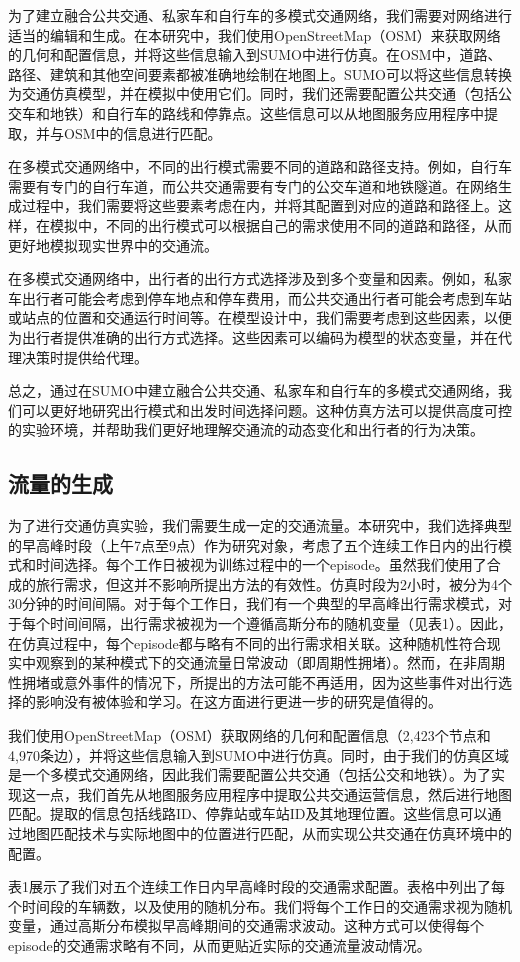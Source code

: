 为了建立融合公共交通、私家车和自行车的多模式交通网络，我们需要对网络进行适当的编辑和生成。在本研究中，我们使用OpenStreetMap（OSM）来获取网络的几何和配置信息，并将这些信息输入到SUMO中进行仿真。在OSM中，道路、路径、建筑和其他空间要素都被准确地绘制在地图上。SUMO可以将这些信息转换为交通仿真模型，并在模拟中使用它们。同时，我们还需要配置公共交通（包括公交车和地铁）和自行车的路线和停靠点。这些信息可以从地图服务应用程序中提取，并与OSM中的信息进行匹配。

在多模式交通网络中，不同的出行模式需要不同的道路和路径支持。例如，自行车需要有专门的自行车道，而公共交通需要有专门的公交车道和地铁隧道。在网络生成过程中，我们需要将这些要素考虑在内，并将其配置到对应的道路和路径上。这样，在模拟中，不同的出行模式可以根据自己的需求使用不同的道路和路径，从而更好地模拟现实世界中的交通流。

在多模式交通网络中，出行者的出行方式选择涉及到多个变量和因素。例如，私家车出行者可能会考虑到停车地点和停车费用，而公共交通出行者可能会考虑到车站或站点的位置和交通运行时间等。在模型设计中，我们需要考虑到这些因素，以便为出行者提供准确的出行方式选择。这些因素可以编码为模型的状态变量，并在代理决策时提供给代理。

总之，通过在SUMO中建立融合公共交通、私家车和自行车的多模式交通网络，我们可以更好地研究出行模式和出发时间选择问题。这种仿真方法可以提供高度可控的实验环境，并帮助我们更好地理解交通流的动态变化和出行者的行为决策。

\subsection{流量的生成}
为了进行交通仿真实验，我们需要生成一定的交通流量。本研究中，我们选择典型的早高峰时段（上午7点至9点）作为研究对象，考虑了五个连续工作日内的出行模式和时间选择。每个工作日被视为训练过程中的一个episode。虽然我们使用了合成的旅行需求，但这并不影响所提出方法的有效性。仿真时段为2小时，被分为4个30分钟的时间间隔。对于每个工作日，我们有一个典型的早高峰出行需求模式，对于每个时间间隔，出行需求被视为一个遵循高斯分布的随机变量（见表1）。因此，在仿真过程中，每个episode都与略有不同的出行需求相关联。这种随机性符合现实中观察到的某种模式下的交通流量日常波动（即周期性拥堵）。然而，在非周期性拥堵或意外事件的情况下，所提出的方法可能不再适用，因为这些事件对出行选择的影响没有被体验和学习。在这方面进行更进一步的研究是值得的。

我们使用OpenStreetMap（OSM）获取网络的几何和配置信息（2,423个节点和4,970条边），并将这些信息输入到SUMO中进行仿真。同时，由于我们的仿真区域是一个多模式交通网络，因此我们需要配置公共交通（包括公交和地铁）。为了实现这一点，我们首先从地图服务应用程序中提取公共交通运营信息，然后进行地图匹配。提取的信息包括线路ID、停靠站或车站ID及其地理位置。这些信息可以通过地图匹配技术与实际地图中的位置进行匹配，从而实现公共交通在仿真环境中的配置。

表1展示了我们对五个连续工作日内早高峰时段的交通需求配置。表格中列出了每个时间段的车辆数，以及使用的随机分布。我们将每个工作日的交通需求视为随机变量，通过高斯分布模拟早高峰期间的交通需求波动。这种方式可以使得每个episode的交通需求略有不同，从而更贴近实际的交通流量波动情况。